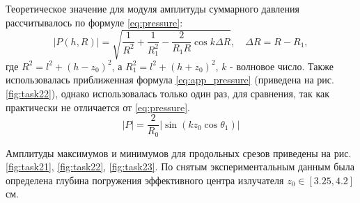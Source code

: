 Теоретическое значение для модуля амплитуды суммарного давления рассчитывалось по формуле \eqref{eq:pressure}:
\begin{equation}
	|P(h,R)| = \sqrt{ \frac{1}{R^2} + \frac{1}{R_1^2} - \frac{2}{R_1 R} \cos k \Delta R },\quad \Delta R = R-R_1,
	\label{eq:pressure}
\end{equation}
где $R^2 = l^2+(h-z_0)^2$, а $R_1^2 = l^2 + (h+z_0)^2$, $k$ - волновое число. Также использовалась
приближенная формула \eqref{eq:app_pressure} (приведена на рис. \ref{fig:task22}), однако использовалась только один
раз, для сравнения, так как практически не отличается от \eqref{eq:pressure}.
\begin{equation}
	|P| = \frac{2}{R_0}|\sin ( k z_0 \cos \theta_1 )|
	\label{eq:app_pressure}
\end{equation}

Амплитуды максимумов и минимумов для продольных срезов приведены на рис. \ref{fig:task21}, \ref{fig:task22}, \ref{fig:task23}. По
снятым экспериментальным данным была определена глубина погружения эффективного центра излучателя $z_0 \in [3.25, 4.2]$
см.

